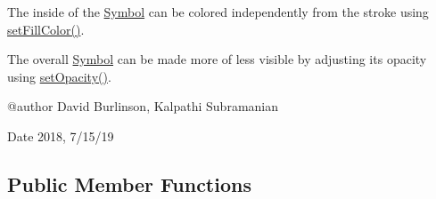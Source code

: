 The inside of the \mbox{\hyperlink{classbridges_1_1base_1_1_symbol}{Symbol}} can be colored independently from the stroke using \mbox{\hyperlink{classbridges_1_1base_1_1_symbol_a850688e5157674aee916fef6cd9e0b8c}{set\+Fill\+Color()}}.

The overall \mbox{\hyperlink{classbridges_1_1base_1_1_symbol}{Symbol}} can be made more of less visible by adjusting its opacity using \mbox{\hyperlink{classbridges_1_1base_1_1_symbol_abac237b439448cbef3744817d14061c5}{set\+Opacity()}}. \begin{DoxyVerb}@author David Burlinson, Kalpathi Subramanian
\end{DoxyVerb}


\begin{DoxyDate}{Date}
2018, 7/15/19 
\end{DoxyDate}
\subsection*{Public Member Functions}
